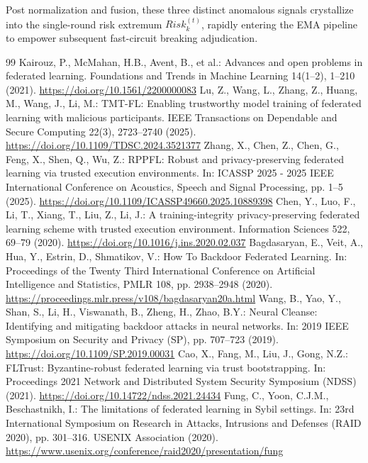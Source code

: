 \documentclass[11pt, a4paper]{article}
\begin{document}
Post normalization and fusion, these three distinct anomalous signals crystallize into the single-round risk extremum $Risk_{k}^{(t)}$, rapidly entering the EMA pipeline to empower subsequent fast-circuit breaking adjudication.

\begin{thebibliography}{99}
     Kairouz, P., McMahan, H.B., Avent, B., et al.: Advances and open problems in federated learning. Foundations and Trends in Machine Learning 14(1--2), 1--210 (2021). \url{https://doi.org/10.1561/2200000083}
     Lu, Z., Wang, L., Zhang, Z., Huang, M., Wang, J., Li, M.: TMT-FL: Enabling trustworthy model training of federated learning with malicious participants. IEEE Transactions on Dependable and Secure Computing 22(3), 2723--2740 (2025). \url{https://doi.org/10.1109/TDSC.2024.3521377}
     Zhang, X., Chen, Z., Chen, G., Feng, X., Shen, Q., Wu, Z.: RPPFL: Robust and privacy-preserving federated learning via trusted execution environments. In: ICASSP 2025 - 2025 IEEE International Conference on Acoustics, Speech and Signal Processing, pp. 1--5 (2025). \url{https://doi.org/10.1109/ICASSP49660.2025.10889398}
     Chen, Y., Luo, F., Li, T., Xiang, T., Liu, Z., Li, J.: A training-integrity privacy-preserving federated learning scheme with trusted execution environment. Information Sciences 522, 69--79 (2020). \url{https://doi.org/10.1016/j.ins.2020.02.037}
     Bagdasaryan, E., Veit, A., Hua, Y., Estrin, D., Shmatikov, V.: How To Backdoor Federated Learning. In: Proceedings of the Twenty Third International Conference on Artificial Intelligence and Statistics, PMLR 108, pp. 2938--2948 (2020). \url{https://proceedings.mlr.press/v108/bagdasaryan20a.html}
     Wang, B., Yao, Y., Shan, S., Li, H., Viswanath, B., Zheng, H., Zhao, B.Y.: Neural Cleanse: Identifying and mitigating backdoor attacks in neural networks. In: 2019 IEEE Symposium on Security and Privacy (SP), pp. 707--723 (2019). \url{https://doi.org/10.1109/SP.2019.00031}
     Cao, X., Fang, M., Liu, J., Gong, N.Z.: FLTrust: Byzantine-robust federated learning via trust bootstrapping. In: Proceedings 2021 Network and Distributed System Security Symposium (NDSS) (2021). \url{https://doi.org/10.14722/ndss.2021.24434}
     Fung, C., Yoon, C.J.M., Beschastnikh, I.: The limitations of federated learning in Sybil settings. In: 23rd International Symposium on Research in Attacks, Intrusions and Defenses (RAID 2020), pp. 301--316. USENIX Association (2020). \url{https://www.usenix.org/conference/raid2020/presentation/fung}

\end{thebibliography}
\end{document}
